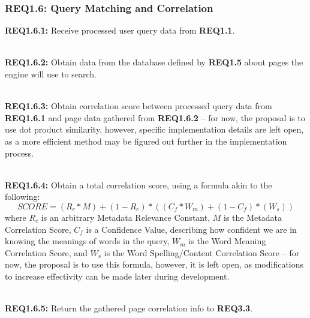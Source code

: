 \subsubsection{REQ1.6: Query Matching and Correlation}

\textbf{REQ1.6.1:} Receive processed user query data from \textbf{REQ1.1}.\par

\textbf{\\REQ1.6.2:} Obtain data from the database defined by \textbf{REQ1.5} about pages the engine will use to search.\par

\textbf{\\REQ1.6.3:} Obtain correlation score between processed query data from \textbf{REQ1.6.1} and page data gathered from \textbf{REQ1.6.2} -- 
for now, the proposal is to use dot product similarity, however, specific implementation details are left open, as a more efficient method may be figured out further in the implementation process.\par

\textbf{\\REQ1.6.4:} Obtain a total correlation score, using a formula akin to the following: 
\[ SCORE = (R_c * M) + (1 - R_c) * ((C_f * W_m) + (1 - C_f) * (W_s)) \]
where \(R_c\) is an arbitrary Metadata Relevance Constant, \(M\) is the Metadata Correlation Score, \(C_f\) is a Confidence Value, describing how confident we are in knowing the meanings of words in the query, 
\(W_m\) is the Word Meaning Correlation Score, and \(W_s\) is the Word Spelling/Content Correlation Score -- 
for now, the proposal is to use this formula, however, it is left open, as modifications to increase effectivity can be made later during development.\par

\textbf{\\REQ1.6.5:} Return the gathered page correlation info to \textbf{REQ3.3}.\par


